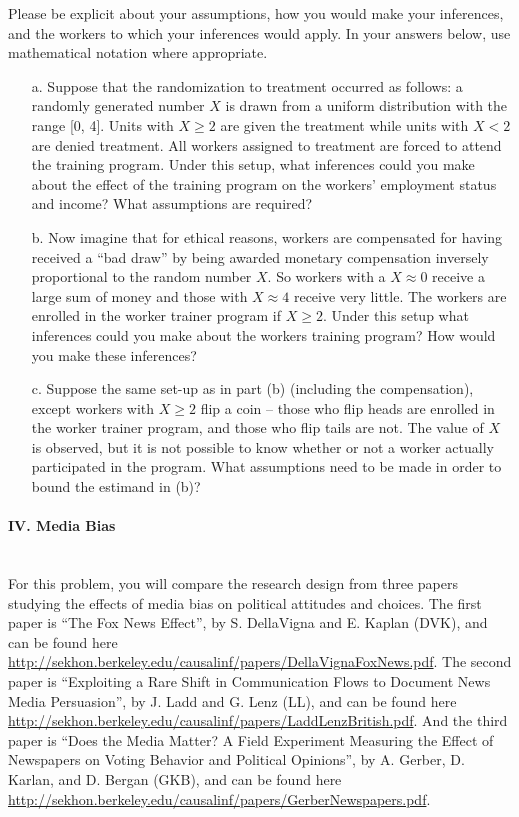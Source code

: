 \documentclass{article}
\begin{document}
Please be explicit about your assumptions, how you would make your
inferences, and the workers to which your inferences would apply. In
your answers below, use mathematical notation where appropriate.

\begin{itemize}
\item[a.] Suppose that the randomization to treatment occurred as
  follows: a randomly generated number $X$ is drawn from a uniform
  distribution with the range [0, 4]. Units with $X \geq 2$ are given
  the treatment while units with $X < 2$ are denied treatment. All
  workers assigned to treatment are forced to attend the training
  program. Under this setup, what inferences could you make about the
  effect of the training program on the workers' employment status and
  income? What assumptions are required?
\item[b.] Now imagine that for ethical reasons, workers are
  compensated for having received a ``bad draw'' by being awarded
  monetary compensation inversely proportional to the random number
  $X$. So workers with a $X \approx 0$ receive a large sum of money
  and those with $X \approx 4$ receive very little. The workers are
  enrolled in the worker trainer program if $X \geq 2$. Under this
  setup what inferences could you make about the workers training
  program? How would you make these inferences?

\item[c.] Suppose the same set-up as in part (b) (including the
  compensation), except workers with $X\geq2$ flip a coin -- those who
  flip heads are enrolled in the worker trainer program, and those who
  flip tails are not.  The value of $X$ is observed, but it is not
  possible to know whether or not a worker actually participated in
  the program.  What assumptions need to be made in order to bound the
  estimand in (b)?
\end{itemize}

\paragraph{\Large IV. Media Bias \\ \\}

For this problem, you will compare the research design from three
papers studying the effects of media bias on political attitudes and
choices.  The first paper is ``The Fox News Effect'', by S.
DellaVigna and E. Kaplan (DVK), and can be found here
\url{http://sekhon.berkeley.edu/causalinf/papers/DellaVignaFoxNews.pdf}. The
second paper is ``Exploiting a Rare Shift in Communication Flows to
Document News Media Persuasion'', by J. Ladd and G. Lenz (LL),
and can be found here
\url{http://sekhon.berkeley.edu/causalinf/papers/LaddLenzBritish.pdf}. And
the third paper is ``Does the Media Matter? A Field Experiment
Measuring the Effect of Newspapers on Voting Behavior and Political
Opinions'', by A. Gerber, D. Karlan, and D. Bergan (GKB), and
can be found here
\url{http://sekhon.berkeley.edu/causalinf/papers/GerberNewspapers.pdf}.
\end{document}

